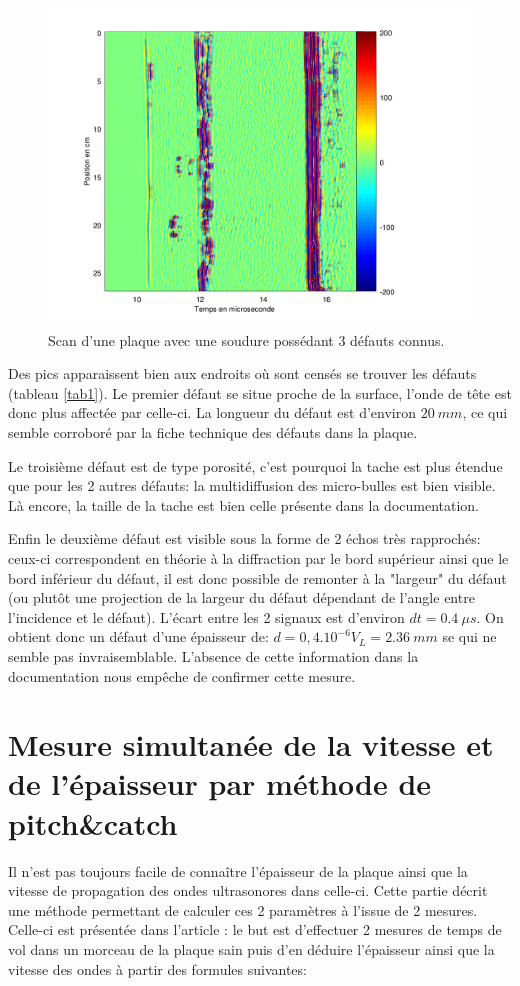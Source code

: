 \documentclass[twoside]{article}
\begin{document}
\begin{multicols}{2}
\begin{figure}[H]
\centering
\includegraphics[scale=0.5]{./images/bscan.png}
\caption{ \label{fig2} Scan d'une plaque avec une soudure possédant 3 défauts connus.}
\end{figure}

Des pics apparaissent bien aux endroits où sont censés se trouver les défauts (tableau \ref{tab1}). 
Le premier défaut se situe proche de la surface, l'onde de tête est donc plus affectée par celle-ci. La longueur du défaut est d'environ $20~mm$, ce qui semble corroboré par la fiche technique des défauts dans la plaque.

Le troisième défaut est de type porosité, c'est pourquoi la tache est plus étendue que pour les 2 autres défauts: la multidiffusion des micro-bulles est bien visible. Là encore, la taille de la tache est bien celle présente dans la documentation.

 Enfin le deuxième défaut est visible sous la forme de 2 échos très rapprochés: ceux-ci correspondent en théorie à la diffraction par le bord supérieur ainsi que le bord inférieur du défaut, il est donc possible de remonter à la "largeur" du défaut (ou plutôt une projection de la largeur du défaut dépendant de l'angle entre l'incidence et le défaut). L'écart entre les 2 signaux est d'environ $dt = 0.4~ \mu s$. On obtient donc un défaut d'une épaisseur de: $d = 0,4.10^{-6} V_L = 2.36~mm$ se qui ne semble pas invraisemblable. L'absence de cette information dans la documentation nous empêche de confirmer cette mesure.

\section{Mesure simultanée de la vitesse et de l'épaisseur par méthode de pitch\&catch}
Il n'est pas toujours facile de connaître l'épaisseur de la plaque ainsi que la vitesse de propagation des ondes ultrasonores dans celle-ci. Cette partie décrit une méthode
permettant de calculer ces 2 paramètres à l'issue de 2 mesures. Celle-ci est présentée dans l'article \cite{article1}: le but est d'effectuer 2 mesures de temps de vol dans un morceau de la plaque sain puis d'en déduire l'épaisseur ainsi que la vitesse des ondes à partir des formules suivantes:


\end{multicols}
\end{document}
